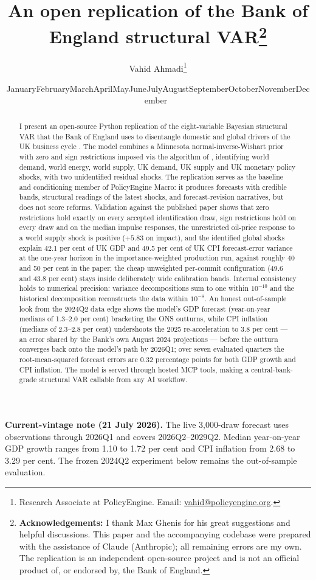 \documentclass[11pt]{article}
\title{\bfseries An open replication of the Bank of England structural VAR\thanks{\textbf{Acknowledgements:} I thank Max Ghenis for his great suggestions and helpful discussions. This paper and the accompanying codebase were prepared with the assistance of Claude (Anthropic); all remaining errors are my own. The replication is an independent open-source project and is not an official product of, or endorsed by, the Bank of England.}\\[0.7cm]}
\author{Vahid Ahmadi\thanks{Research Associate at PolicyEngine. Email: \href{mailto:vahid@policyengine.org}{vahid@policyengine.org}.}}
\date{\small \ifcase\month\or January\or February\or March\or April\or May\or June\or July\or August\or September\or October\or November\or December\fi\ \the\year}
\begin{document}
\maketitle

\begin{abstract}
\noindent I present an open-source Python replication of the eight-variable Bayesian structural VAR that the Bank of England uses to disentangle domestic and global drivers of the UK business cycle \citep{brignone2025}. The model combines a Minnesota normal-inverse-Wishart prior with zero and sign restrictions imposed via the algorithm of \citet{arias2018}, identifying world demand, world energy, world supply, UK demand, UK supply and UK monetary policy shocks, with two unidentified residual shocks. The replication serves as the baseline and conditioning member of PolicyEngine Macro: it produces forecasts with credible bands, structural readings of the latest shocks, and forecast-revision narratives, but does not score reforms. Validation against the published paper shows that zero restrictions hold exactly on every accepted identification draw, sign restrictions hold on every draw and on the median impulse responses, the unrestricted oil-price response to a world supply shock is positive ($+5.83$ on impact), and the identified global shocks explain 42.1 per cent of UK GDP and 49.5 per cent of UK CPI forecast-error variance at the one-year horizon in the importance-weighted production run, against roughly 40 and 50 per cent in the paper; the cheap unweighted per-commit configuration (49.6 and 43.8 per cent) stays inside deliberately wide calibration bands. Internal consistency holds to numerical precision: variance decompositions sum to one within $10^{-10}$ and the historical decomposition reconstructs the data within $10^{-8}$. An honest out-of-sample look from the 2024Q2 data edge shows the model's GDP forecast (year-on-year medians of 1.3--2.0 per cent) bracketing the ONS outturns, while CPI inflation (medians of 2.3--2.8 per cent) undershoots the 2025 re-acceleration to 3.8 per cent --- an error shared by the Bank's own August 2024 projections --- before the outturn converges back onto the model's path by 2026Q1; over seven evaluated quarters the root-mean-squared forecast errors are 0.32 percentage points for both GDP growth and CPI inflation. The model is served through hosted MCP tools, making a central-bank-grade structural VAR callable from any AI workflow.
\end{abstract}

\medskip
\noindent\textbf{Current-vintage note (21 July 2026).} The live 3,000-draw forecast uses observations through 2026Q1 and covers 2026Q2--2029Q2. Median year-on-year GDP growth ranges from 1.10 to 1.72 per cent and CPI inflation from 2.68 to 3.29 per cent. The frozen 2024Q2 experiment below remains the out-of-sample evaluation.
\end{document}
